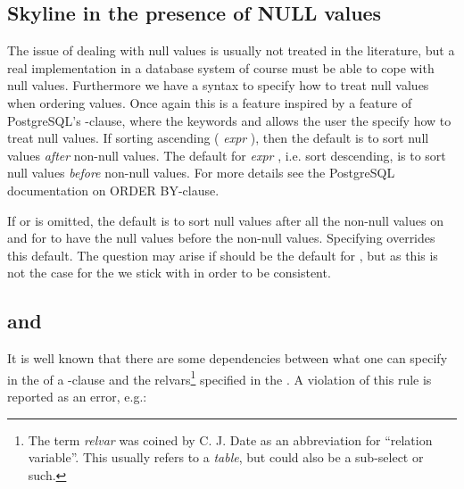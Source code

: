 \subsection{Skyline in the presence of NULL values}
\label{sec:nullvalues}
The issue of dealing with null values is usually not treated in the
literature, but a real implementation in a database system of course
must be able to cope with null values.  Furthermore we have a syntax
to specify how to treat null values when ordering values.  Once again this is a feature
inspired by a feature of PostgreSQL's -clause, where
the keywords  and  allows
the user the specify how to treat null values.  
If sorting ascending ( \emph{expr}
), then the default is to sort null values \emph{after}
non-null values.
%
The default for  \emph{expr} , i.e. sort
descending, is to sort null values \emph{before} non-null values.
%
For more details see the PostgreSQL documentation on ORDER BY-clause.

If  or  is omitted, the
default is to sort null values after all the non-null values on
 and for  to have
the null values before the non-null values.  Specifying
 overrides this default.  
The question
may arise if  should be the default for
, but as this is not the case for the
 we stick with  in order to
be consistent.


\subsection{ and }
It is well known that there are some dependencies between what one can
specify in the  of a -clause and
the relvars\footnote{The term \emph{relvar} was coined by C. J. Date
as an abbreviation for ``relation variable''.  This usually refers to
a \emph{table}, but could also be a sub-select or such.} specified
in the .  A violation of this rule is reported as an
error, e.g.:

